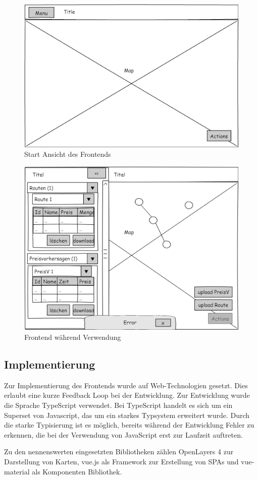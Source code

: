\documentclass[
ngerman          %
,a4paper          %
,11pt
,pdftex
]{report}
\begin{document}
\begin{figure}
\centering
\includegraphics[width=0.7\linewidth]{startview.png}
\caption{Start Ansicht des Frontends}
\label{fig:startview}
\end{figure}

\begin{figure}
\centering
\includegraphics[width=0.7\linewidth]{draweropen.png}
\caption{Frontend während Verwendung}
\label{fig:draweropen}
\end{figure}

\subsection{Implementierung}

Zur Implementierung des Frontends wurde auf Web-Technologien gesetzt. Dies erlaubt eine kurze Feedback Loop bei der Entwicklung. Zur Entwicklung wurde die Sprache TypeScript verwendet. Bei TypeScript handelt es sich um ein Superset von Javascript, das um ein starkes Typsystem erweitert wurde. Durch die starke Typisierung ist es möglich, bereits während der Entwicklung Fehler zu erkennen, die bei der Verwendung von JavaScript erst zur Laufzeit auftreten.

Zu den nennenswerten eingesetzten Bibliotheken zählen OpenLayers 4 zur Darstellung von Karten, vue.js als Framework zur Erstellung von \acp{SPA} und vue-material als Komponenten Bibliothek.
\end{document}
